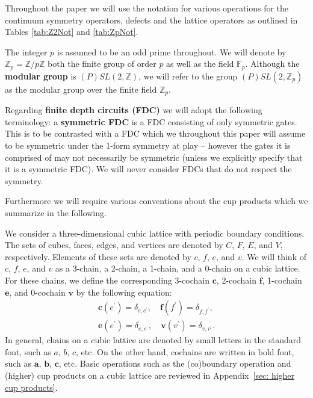 \documentclass[aps,twocolumn,prx,floatfix,preprintnumbers, nofootinbib,10pt]{revtex4-2}
\numberwithin{equation}{section}
\theoremstyle{definition}
\theoremstyle{remark}
\theoremstyle{claim}
\newcommand{\Z}{{\mathbb Z}}
\begin{document}
Throughout the paper we will use the notation for various operations for the continuum symmetry operators, defects and the lattice operators as outlined in Tables \ref{tab:Z2Not} and \ref{tab:ZpNot}. 

The integer $p$ is assumed to be an odd prime throughout. We will denote by $\Z_p = \Z/p\Z$ both the finite group of order $p$ as well as the field $\mathbb{F}_p$.  
Although the {\bf modular group} is $(P)SL(2,\Z)$, we will refer to the group $(P)SL (2,\Z_p)$ as the modular group over the finite field $\Z_p$.


Regarding {\bf finite depth circuits (FDC)} we will adopt the following terminology: a {\bf symmetric FDC} is a FDC consisting of only symmetric gates. This is to be contrasted with a FDC which we throughout this paper will assume to be symmetric under the 1-form symmetry at play -- however the gates it is comprised of may not necessarily be symmetric (unless we explicitly specify that it is a symmetric FDC). We will never consider FDCs that do not respect the symmetry. 

Furthermore we will require various conventions about the cup products which we summarize in the following. 


\vspace*{\baselineskip}
We consider a three-dimensional cubic lattice with periodic boundary conditions.
The sets of cubes, faces, edges, and vertices are denoted by $C$, $F$, $E$, and $V$, respectively.
Elements of these sets are denoted by $c$, $f$, $e$, and $v$.
We will think of $c$, $f$, $e$, and $v$ as a 3-chain, a 2-chain, a 1-chain, and a 0-chain on a cubic lattice.
For these chains, we define the corresponding 3-cochain $\bm{c}$, 2-cochain $\bm{f}$, 1-cochain $\bm{e}$, and 0-cochain $\bm{v}$ by the following equation:
\begin{equation}
\begin{aligned}
\bm{c}(c^{\prime}) = \delta_{c, c^{\prime}}, \quad
\bm{f}(f^{\prime}) = \delta_{f, f^{\prime}}, \\
\bm{e}(e^{\prime}) = \delta_{e, e^{\prime}}, \quad
\bm{v}(v^{\prime}) = \delta_{v, v^{\prime}}.
\end{aligned}
\end{equation}
In general, chains on a cubic lattice are denoted by small letters in the standard font, such as $a$, $b$, $c$, etc.
On the other hand, cochains are written in bold font, such as $\bm{a}$, $\bm{b}$, $\bm{c}$, etc.
Basic operations such as the (co)boundary operation and (higher) cup products on a cubic lattice are reviewed in Appendix~\ref{sec: higher cup products}.
\end{document}
